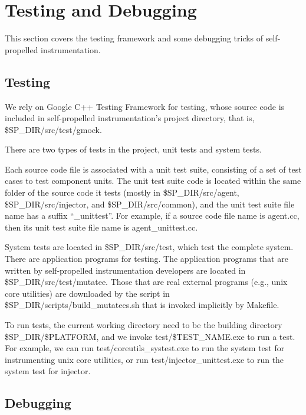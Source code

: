 \section{Testing and Debugging}
This section covers the testing framework and some debugging tricks of
self-propelled instrumentation.
\subsection{Testing}
We rely on Google C++ Testing Framework for testing, whose source code is
included in self-propelled instrumentation's project directory, that is,
\$SP\_DIR/src/test/gmock.

There are two types of tests in the project, unit tests and system tests.

Each source code file is associated with a unit test suite, consisting of a set
of test cases to test component units.
The unit test suite code is located within the same folder of the source code it
tests (mostly in \$SP\_DIR/src/agent, \$SP\_DIR/src/injector, and
\$SP\_DIR/src/common), and the unit test suite file name has a suffix
``_unittest''.
For example, if a source code file name is agent.cc, then its unit test suite
file name is agent_unittest.cc.

System tests are located in \$SP\_DIR/src/test, which test the complete system.
There are application programs for testing.
The application programs that are written by self-propelled instrumentation
developers are located in \$SP\_DIR/src/test/mutatee.
Those that are real external programs (e.g., unix core utilities) are downloaded
by the script in \$SP\_DIR/scripts/build_mutatees.sh that is invoked implicitly
by Makefile.

To run tests, the current working directory need to be the building directory
\$SP\_DIR/\$PLATFORM, and we invoke test/\$TEST\_NAME.exe to run a test.
For example, we can run test/coreutils_systest.exe to run the system test for
instrumenting unix core utilities, or run test/injector\_unittest.exe to run the
system test for injector.

\subsection{Debugging}

